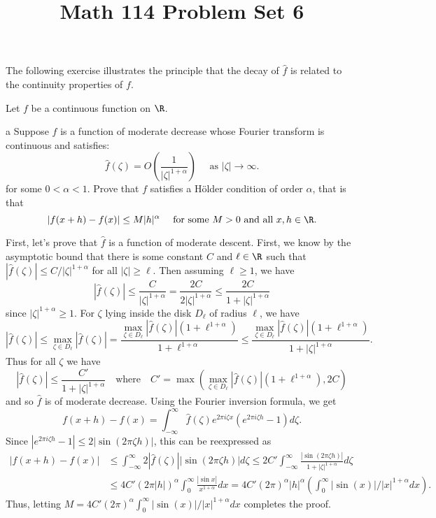 \documentclass[11pt,letterpaper]{article}
\title{\textbf{Math 114 Problem Set 6}}
\begin{document}
\maketitle

\begin{problem}
    The following exercise illustrates the principle that the decay of $\widehat{f}$ is related to the continuity properties of $f$.
\end{problem}

\begin{solution}
    Let $f$ be a continuous function on $\R$.
    \begin{partproblem}{a}
        Suppose $f$ is a function of moderate decrease whose Fourier transform is continuous and satisfies:
        \[
            \widehat{f}(\zeta) = O\left(\frac{1}{|\zeta|^{1+\alpha}}\right)\quad \text{ as }|\zeta|\to \infty
        .\] 
        for some $0 < \alpha < 1$. Prove that $f$ satisfies a H\"older condition of order $\alpha$, that is that
        \[
            |f(x+h)-f(x)|\leq M|h|^\alpha\quad\text{ for some }M > 0\text{ and all }x,h\in \R
        .\] 
    \end{partproblem}
    \quad First, let's prove that $\widehat{f}$ is a function of moderate descent. First, we know by the asymptotic bound that there is some constant $C$ and $\ell\in \R$ such that $|\widehat{f}(\zeta)| \leq C / |\zeta|^{1+\alpha}$ for all $|\zeta|\geq \ell$. Then assuming $\ell\geq 1$, we have
    \[
        |\widehat{f}(\zeta)| \leq \frac{C}{|\zeta|^{1+\alpha}} =\frac{2C}{2|\zeta|^{1+\alpha}} \leq \frac{2C}{1+|\zeta|^{1+\alpha}}
    \]
    since $|\zeta|^{1+\alpha}\geq 1$. For $\zeta$ lying inside the disk $D_\ell$ of radius $\ell$, we have
    \[
        |\widehat{f}(\zeta)| \leq \max_{\zeta\in D_\ell} |\widehat{f}(\zeta)| = \frac{\max_{\zeta\in D_\ell} |\widehat{f}(\zeta)| (1+\ell^{1+\alpha})}{1+\ell^{1+\alpha}}\leq \frac{\max_{\zeta\in D_\ell} |\widehat{f}(\zeta)| (1+\ell^{1+\alpha})}{1+|\zeta|^{1+\alpha}}
    .\] 
    Thus for all $\zeta$ we have 
    \[
        |\widehat{f}(\zeta)| \leq \frac{C'}{1+|\zeta|^{1+\alpha}}\quad\text{where}\quad C' = \max\left(\max_{\zeta\in D_\ell} |\widehat{f}(\zeta)|(1+\ell^{1+\alpha}), 2C\right)
    \] 
    and so $\widehat{f}$ is of moderate decrease. Using the Fourier inversion formula, we get 
    \[
        f(x+h)-f(x) = \int^\infty_{-\infty} \widehat{f}(\zeta)e^{2\pi i \zeta x}(e^{2\pi i \zeta h} - 1)d\zeta
    .\]
    Since $|e^{2\pi i \zeta h} - 1| \leq 2|\sin(2\pi \zeta h)|$, this can be reexpressed as
    \[
        \begin{aligned}
            |f(x+h)-f(x)| &\leq \int^\infty_{-\infty} 2|\widehat{f}(\zeta)||\sin(2\pi \zeta h)| d\zeta \leq 2C'\int^\infty_{-\infty} \frac{|\sin(2\pi \zeta h)|}{1+|\zeta|^{1+\alpha}}d\zeta\\
            &\leq 4C'(2\pi |h|)^\alpha \int_0^\infty \frac{|\sin x|}{x^{1+\alpha}}dx = 4C'(2\pi)^\alpha |h|^\alpha\left(\int^\infty_0 |\sin(x)|/|x|^{1+\alpha} dx\right).
        \end{aligned}
    \] 
    Thus, letting $M = 4C'(2\pi)^\alpha\int^\infty_0 |\sin(x)| / |x|^{1+\alpha}dx$ completes the proof.


\end{solution}
\end{document}
